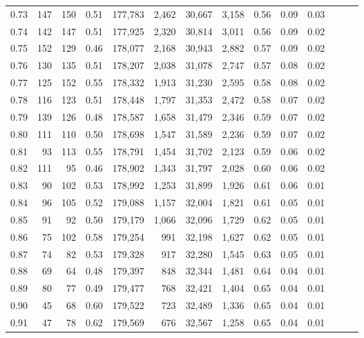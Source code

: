 \begin{tabular}{rrrrrrrrrrrrrr}
0.73 &    147 &  150 &  0.51 &  177,783 &    2,462 &  30,667 &   3,158 &  0.56 &  0.09 &      0.03 \\
0.74 &    142 &  147 &  0.51 &  177,925 &    2,320 &  30,814 &   3,011 &  0.56 &  0.09 &      0.02 \\
0.75 &    152 &  129 &  0.46 &  178,077 &    2,168 &  30,943 &   2,882 &  0.57 &  0.09 &      0.02 \\
0.76 &    130 &  135 &  0.51 &  178,207 &    2,038 &  31,078 &   2,747 &  0.57 &  0.08 &      0.02 \\
0.77 &    125 &  152 &  0.55 &  178,332 &    1,913 &  31,230 &   2,595 &  0.58 &  0.08 &      0.02 \\
0.78 &    116 &  123 &  0.51 &  178,448 &    1,797 &  31,353 &   2,472 &  0.58 &  0.07 &      0.02 \\
0.79 &    139 &  126 &  0.48 &  178,587 &    1,658 &  31,479 &   2,346 &  0.59 &  0.07 &      0.02 \\
0.80 &    111 &  110 &  0.50 &  178,698 &    1,547 &  31,589 &   2,236 &  0.59 &  0.07 &      0.02 \\
0.81 &     93 &  113 &  0.55 &  178,791 &    1,454 &  31,702 &   2,123 &  0.59 &  0.06 &      0.02 \\
0.82 &    111 &   95 &  0.46 &  178,902 &    1,343 &  31,797 &   2,028 &  0.60 &  0.06 &      0.02 \\
0.83 &     90 &  102 &  0.53 &  178,992 &    1,253 &  31,899 &   1,926 &  0.61 &  0.06 &      0.01 \\
0.84 &     96 &  105 &  0.52 &  179,088 &    1,157 &  32,004 &   1,821 &  0.61 &  0.05 &      0.01 \\
0.85 &     91 &   92 &  0.50 &  179,179 &    1,066 &  32,096 &   1,729 &  0.62 &  0.05 &      0.01 \\
0.86 &     75 &  102 &  0.58 &  179,254 &      991 &  32,198 &   1,627 &  0.62 &  0.05 &      0.01 \\
0.87 &     74 &   82 &  0.53 &  179,328 &      917 &  32,280 &   1,545 &  0.63 &  0.05 &      0.01 \\
0.88 &     69 &   64 &  0.48 &  179,397 &      848 &  32,344 &   1,481 &  0.64 &  0.04 &      0.01 \\
0.89 &     80 &   77 &  0.49 &  179,477 &      768 &  32,421 &   1,404 &  0.65 &  0.04 &      0.01 \\
0.90 &     45 &   68 &  0.60 &  179,522 &      723 &  32,489 &   1,336 &  0.65 &  0.04 &      0.01 \\
0.91 &     47 &   78 &  0.62 &  179,569 &      676 &  32,567 &   1,258 &  0.65 &  0.04 &      0.01 \\

\end{tabular}
